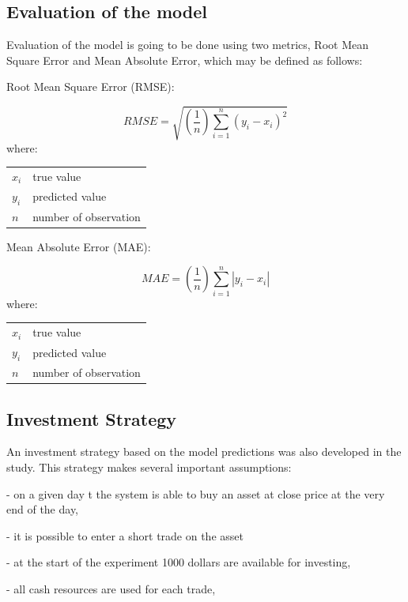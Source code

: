 \documentclass[review]{elsarticle} %
\makeatletter
\newenvironment{conditions}
{\par\vspace{\abovedisplayskip}\noindent\begin{tabular}{>{$}l<{$} @{${}={}$} l}}
       {\end{tabular}\par\vspace{\belowdisplayskip}}
\makeatother
\begin{document}
\subsection{Evaluation of the model}

Evaluation of the model is going to be done using two metrics, Root Mean Square Error and Mean Absolute Error, which may be defined as follows:  \\ 

\begin{center}   Root Mean Square Error (RMSE):  \end{center}
\begin{equation}  RMSE = \sqrt{(\frac{1}{n})\sum_{i=1}^{n}(y_{i} - x_{i})^{2}} \end{equation}
where:
\begin{conditions}
 x_i     &  true value \\
 y_i     &  predicted value \\   
 n &  number of observation
\end{conditions}

\begin{center}  Mean Absolute Error (MAE): \end{center}
\begin{equation} MAE =(\frac{1}{n})\sum_{i=1}^{n}\left | y_{i} - x_{i} \right | \end{equation}
where:
\begin{conditions}
 x_i     &  true value \\
 y_i     &  predicted value \\   
 n &  number of observation
\end{conditions}

\subsection{Investment Strategy}

An investment strategy based on the model predictions was also developed in the study. This strategy makes several important assumptions:
 
\noindent- on a given day t the system is able to buy an asset at close price at the very end of the day,

\noindent- it is possible to enter a short trade on the asset

\noindent- at the start of the experiment 1000 dollars are available for investing,  

\noindent- all cash resources are used for each trade, 
\end{document}
